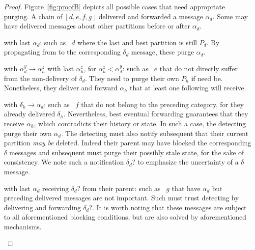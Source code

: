 \begin{proof}
  Figure~\ref{fig:proofB} depicts all possible cases that need
  appropriate purging. A chain of \processes $[d, e, f, g]$ delivered
  and forwarded a message $\alpha_d$. Some \processes may have
  delivered messages about other partitions before or after
  $\alpha_d$.
  \begin{asparadesc}
  \item [\processes with last $\alpha_d$:] \Processes such as
    \Process~$d$ where the last and best partition is still $P_d$. By
    propagating from \process to \process the corresponding $\delta_d$
    message, these \processes purge $\alpha_d$.
  \item [\processes with $\alpha_d^y \rightarrow \alpha_h^z$ with last
    $\alpha_h^z$, for $\alpha_h^z < \alpha_d^y$:] \Processes such as
    \Process~$e$ that do not directly suffer from the non-delivery of
    $\delta_d$. They need to purge their own $P_h$ if need
    be. Nonetheless, they deliver and forward $\alpha_h$ that at least
    one following \process will receive.
  \item [\processes with $\delta_h \rightarrow \alpha_d$:] \Processes
    such as \Process~$f$ that do not belong to the preceding category,
    for they already delivered $\delta_h$. Nevertheless, best eventual
    forwarding guarantees that they receive $\alpha_h$, which
    contradicts their history or state. In such a case, the detecting
    \processes purge their own $\alpha_d$. The detecting \processes
    must also notify subsequent \processes that their current
    partition \emph{may be} deleted. Indeed their parent may have
    blocked the corresponding $\delta$ messages and subsequent
    \processes must purge their possibly stale state, for the sake of
    consistency.  We note such a notification $\delta_d?$ to emphasize
    the uncertainty of a $\delta$ message.
  \item [\processes with last $\alpha_d$ receiving $\delta_d?$ from
    their parent:] \Processes such as \Process~$g$ that have
    $\alpha_d$ but preceding delivered messages are not
    important. Such \processes must trust detecting \processes by
    delivering and forwarding $\delta_d?$. It is worth noting that
    these messages are subject to all aforementioned blocking
    conditions, but are also solved by aforementioned mechanisms.
  \end{asparadesc}


\end{proof}
